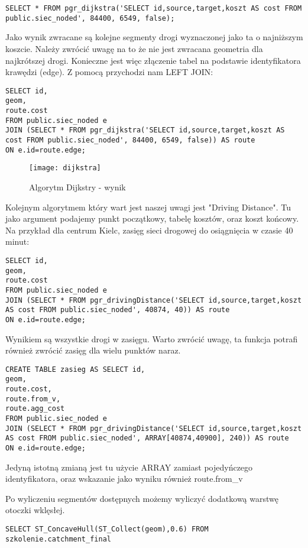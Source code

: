 \begin{lstlisting}
SELECT * FROM pgr_dijkstra('SELECT id,source,target,koszt AS cost FROM public.siec_noded', 84400, 6549, false);
\end{lstlisting}
Jako wynik zwracane są kolejne segmenty drogi wyznaczonej jako ta o najniższym koszcie.
Należy zwrócić uwagę na to że nie jest zwracana geometria dla najkrótszej drogi. Konieczne jest więc złączenie tabel na podstawie identyfikatora krawędzi (edge). Z pomocą przychodzi nam LEFT JOIN:
\begin{lstlisting}
SELECT id, 
geom, 
route.cost 
FROM public.siec_noded e 
JOIN (SELECT * FROM pgr_dijkstra('SELECT id,source,target,koszt AS cost FROM public.siec_noded', 84400, 6549, false)) AS route 
ON e.id=route.edge;
\end{lstlisting}

\begin{figure}[!ht]
	\centering
	\texttt{[image: dijkstra]}
	\caption{Algorytm Dijkstry - wynik}
\end{figure}
Kolejnym algorytmem który wart jest naszej uwagi jest "Driving Distance". Tu jako argument podajemy punkt początkowy, tabelę kosztów, oraz koszt końcowy. Na przykład dla centrum Kielc, zasięg sieci drogowej do osiągnięcia w czasie 40 minut:
\begin{lstlisting}
SELECT id, 
geom, 
route.cost 
FROM public.siec_noded e 
JOIN (SELECT * FROM pgr_drivingDistance('SELECT id,source,target,koszt AS cost FROM public.siec_noded', 40874, 40)) AS route 
ON e.id=route.edge;
\end{lstlisting} 

Wynikiem są wszystkie drogi w zasięgu. Warto zwrócić uwagę, ta funkcja potrafi również zwrócić zasięg dla wielu punktów naraz. 
\begin{lstlisting}
CREATE TABLE zasieg AS SELECT id, 
geom, 
route.cost, 
route.from_v,
route.agg_cost
FROM public.siec_noded e 
JOIN (SELECT * FROM pgr_drivingDistance('SELECT id,source,target,koszt AS cost FROM public.siec_noded', ARRAY[40874,40900], 240)) AS route 
ON e.id=route.edge;
\end{lstlisting}
Jedyną istotną zmianą jest tu użycie ARRAY zamiast pojedyńczego identyfikatora, oraz wskazanie jako wyniku również route.from\_v

Po wyliczeniu segmentów dostępnych możemy wyliczyć dodatkową warstwę otoczki wklęsłej.
\begin{lstlisting}
SELECT ST_ConcaveHull(ST_Collect(geom),0.6) FROM szkolenie.catchment_final
\end{lstlisting}